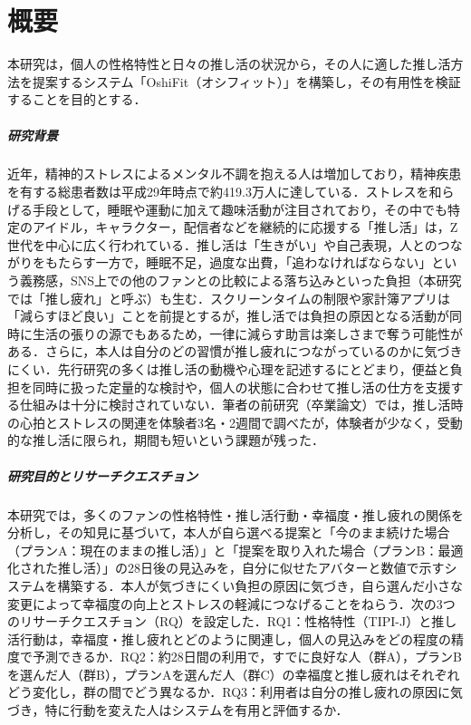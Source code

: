 \chapter*{概要}

本研究は，個人の性格特性と日々の推し活の状況から，その人に適した推し活方法を提案するシステム「OshiFit（オシフィット）」を構築し，その有用性を検証することを目的とする．

\paragraph{研究背景}
近年，精神的ストレスによるメンタル不調を抱える人は増加しており，精神疾患を有する総患者数は平成29年時点で約419.3万人に達している．ストレスを和らげる手段として，睡眠や運動に加えて趣味活動が注目されており，その中でも特定のアイドル，キャラクター，配信者などを継続的に応援する「推し活」は，Z世代を中心に広く行われている．推し活は「生きがい」や自己表現，人とのつながりをもたらす一方で，睡眠不足，過度な出費，「追わなければならない」という義務感，SNS上での他のファンとの比較による落ち込みといった負担（本研究では「推し疲れ」と呼ぶ）も生む．スクリーンタイムの制限や家計簿アプリは「減らすほど良い」ことを前提とするが，推し活では負担の原因となる活動が同時に生活の張りの源でもあるため，一律に減らす助言は楽しさまで奪う可能性がある．さらに，本人は自分のどの習慣が推し疲れにつながっているのかに気づきにくい．先行研究の多くは推し活の動機や心理を記述するにとどまり，便益と負担を同時に扱った定量的な検討や，個人の状態に合わせて推し活の仕方を支援する仕組みは十分に検討されていない．筆者の前研究（卒業論文）では，推し活時の心拍とストレスの関連を体験者3名・2週間で調べたが，体験者が少なく，受動的な推し活に限られ，期間も短いという課題が残った．

\paragraph{研究目的とリサーチクエスチョン}
本研究では，多くのファンの性格特性・推し活行動・幸福度・推し疲れの関係を分析し，その知見に基づいて，本人が自ら選べる提案と「今のまま続けた場合（プランA：現在のままの推し活）」と「提案を取り入れた場合（プランB：最適化された推し活）」の28日後の見込みを，自分に似せたアバターと数値で示すシステムを構築する．本人が気づきにくい負担の原因に気づき，自ら選んだ小さな変更によって幸福度の向上とストレスの軽減につなげることをねらう．次の3つのリサーチクエスチョン（RQ）を設定した．RQ1：性格特性（TIPI-J）と推し活行動は，幸福度・推し疲れとどのように関連し，個人の見込みをどの程度の精度で予測できるか．RQ2：約28日間の利用で，すでに良好な人（群A），プランBを選んだ人（群B），プランAを選んだ人（群C）の幸福度と推し疲れはそれぞれどう変化し，群の間でどう異なるか．RQ3：利用者は自分の推し疲れの原因に気づき，特に行動を変えた人はシステムを有用と評価するか．

